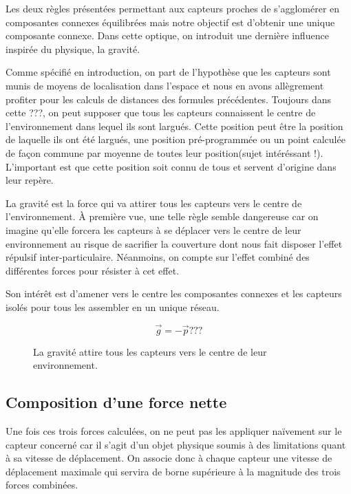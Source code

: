 \documentclass[10pt]{article}
\begin{document}
\begin{multicols}{2}
Les deux règles présentées permettant aux capteurs proches de
s'agglomérer en composantes connexes équilibrées mais notre objectif
est d'obtenir une unique composante connexe. Dans cette optique, on
introduit une dernière influence inspirée du physique, la gravité.

Comme spécifié en introduction, on part de l'hypothèse que les
capteurs sont munis de moyens de localisation dans l'espace et nous en
avons allègrement profiter pour les calculs de distances des formules
précédentes. Toujours dans cette ???, on peut supposer que tous les
capteurs connaissent le centre de l'environnement dans lequel ils sont
largués. Cette position peut être la position de laquelle ils ont été
largués, une position pré-programmée ou un point calculée de façon
commune par moyenne de toutes leur position(sujet intéréssant
!). L'important est que cette position soit connu de tous et servent
d'origine dans leur repère.

La gravité est la force qui va attirer tous les capteurs vers le
centre de l'environnement. \`A première vue, une telle règle semble
dangereuse car on imagine qu'elle forcera les capteurs à se déplacer
vers le centre de leur environnement au risque de sacrifier la
couverture dont nous fait disposer l'effet répulsif
inter-particulaire. Néanmoins, on compte sur l'effet combiné des
différentes forces pour résister à cet effet.

Son intérêt est d'amener vers le centre les composantes connexes et
les capteurs isolés pour tous les assembler en un unique réseau.

$$
\vec{g} = -\vec{p} ???
$$

\begin{figure}[H]

  \centering

  

  \caption{La gravité attire tous les capteurs vers le centre de leur
    environnement.}
  \label{gravite}

\end{figure}

\subsection{Composition d'une force nette}

Une fois ces trois forces calculées, on ne peut pas les appliquer
naïvement sur le capteur concerné car il s'agit d'un objet physique
soumis à des limitations quant à sa vitesse de déplacement. On associe
donc à chaque capteur une vitesse de déplacement maximale qui servira
de borne supérieure à la magnitude des trois forces combinées.


\end{multicols}
\end{document}
